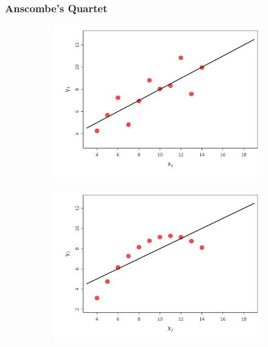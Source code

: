 \documentclass[a4paper,12pt]{article}
\begin{document}
\subsubsection*{Anscombe's Quartet}
%

\begin{figure}[H]
	\begin{subfigure}[c]{0.49\textwidth}
 \centering
\includegraphics[width=1\textwidth]{figures/Anscombe_data1}
 						
  \end{subfigure}%
	\begin{subfigure}[c]{0.49\textwidth}
 \centering
\includegraphics[width=1\textwidth]{figures/Anscombe_data2}
							

\end{subfigure}
\end{figure}
\end{document}
